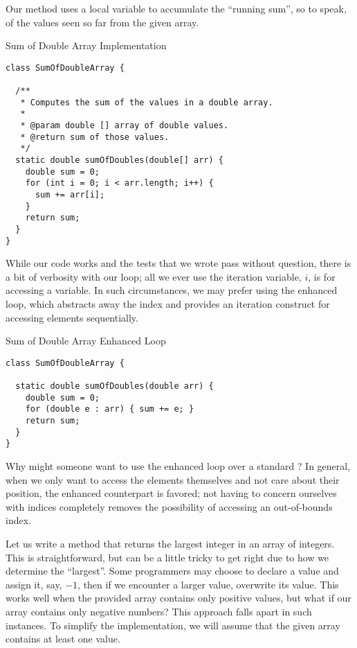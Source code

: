 Our method uses a local variable to accumulate the ``running sum'', so to speak, of the values seen so far from the given array.

\begin{cl}{Sum of Double Array Implementation}
\begin{lstlisting}[language=MyJava]
class SumOfDoubleArray {

  /**
   * Computes the sum of the values in a double array.
   *
   * @param double [] array of double values.
   * @return sum of those values.
   */
  static double sumOfDoubles(double[] arr) {
    double sum = 0;
    for (int i = 0; i < arr.length; i++) {
      sum += arr[i];
    }
    return sum;
  }
}
\end{lstlisting}
\end{cl}

While our code works and the tests that we wrote pass without question, there is a bit of verbosity with our loop; all we ever use the iteration variable, $i$, is for accessing a variable. In such circumstances, we may prefer using the enhanced  loop, which abstracts away the index and provides an iteration construct for accessing elements sequentially.

\begin{cl}{Sum of Double Array Enhanced  Loop}
\begin{lstlisting}[language=MyJava]
class SumOfDoubleArray {

  static double sumOfDoubles(double arr) {
    double sum = 0;
    for (double e : arr) { sum += e; }
    return sum;
  }
}
\end{lstlisting}
\end{cl}

Why might someone want to use the enhanced  loop over a standard ? In general, when we only want to access the elements themselves and not care about their position, the enhanced counterpart is favored; not having to concern ourselves with indices completely removes the possibility of accessing an out-of-bounds index. 

\example Let us write a method that returns the largest integer in an array of integers. This is straightforward, but can be a little tricky to get right due to how we determine the ``largest''. Some programmers may choose to declare a value  and assign it, say, $-1$, then if we encounter a larger value, overwrite its value. This works well when the provided array contains only positive values, but what if our array contains only negative numbers? This approach falls apart in such instances. To simplify the implementation, we will assume that the given array contains at least one value.

